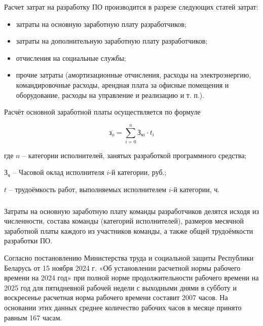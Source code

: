 Расчет затрат на разработку ПО производится в разрезе следующих статей затрат:

\begin{itemize}
	\item затраты на основную заработную плату разработчиков;
	\item затраты на дополнительную заработную плату разработчиков;
	\item отчисления на социальные службы;
	\item прочие затраты (амортизационные отчисления, расходы на 
		электроэнергию, командировочные расходы, арендная плата за офисные
		помещения и оборудование, расходы на управление и реализацию и т. п.).
\end{itemize}

Расчёт основной заработной платы осуществляется по формуле

\begin{equation}
	\label{eq:зарплата}
	\text{з}_o = \sum_{i=0}^{n} \text{З}_{\text{ч}i} \cdot t_i
\end{equation}


\begin{explanationx}
	\item[где]  $n$  -- категории исполнителей, занятых разработкой
		программного средства;
	\item $\text{З}_\text{ч}$ --  Часовой оклад исполнителя $i\text{-й}$
		категории, руб.;
	\item $t$  -- трудоёмкость работ, выполняемых исполнителем $i\text{-й}$
		категории, ч.
\end{explanationx}


\subsubsection{} Затраты на основную заработную плату команды разработчиков
делятся исходя из численности, состава команды (категорий исполнителей), 
размеров месячной заработной платы каждого из участников команды, а также
общей трудоёмкости разработки ПО. 

\def \hoursPerMonth {167}

Согласно постановлению Министерства труда и социальной защиты Республики
Беларусь от 15 ноября 2024 г.  «Об установлении расчетной нормы рабочего
времени на 2024 год» при полной норме продолжительности рабочего времени на
2025 год для пятидневной рабочей недели с выходными днями в субботу и
воскресенье расчетная норма рабочего времени составит 2007 часов. На основании
этих данных среднее количество рабочих часов в месяце принято равным
\hoursPerMonth{} часам.


